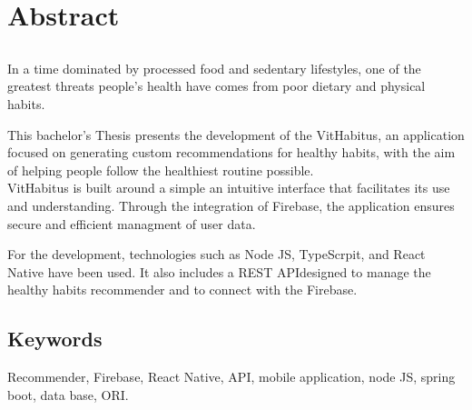 \chapter*{Abstract}

\section*{\tituloPortadaEngVal}

In a time dominated by processed food and sedentary lifestyles, one of the greatest  threats people's health have comes from poor dietary and physical habits.

This bachelor's Thesis presents the development of the VitHabitus, an application focused on generating custom recommendations for healthy habits, with the aim of helping people follow the healthiest routine possible.\\

VitHabitus is built around a simple an intuitive interface that facilitates its use and understanding. Through the integration of Firebase, the application ensures secure and efficient managment of user data.

For the development, technologies such as Node JS, TypeScrpit, and React Native have been used. It also includes a REST APIdesigned to manage the healthy habits recommender and to connect with the Firebase.


\section*{Keywords}

\noindent Recommender, Firebase, React Native, API, mobile application, node JS, spring boot, data base, ORI.



